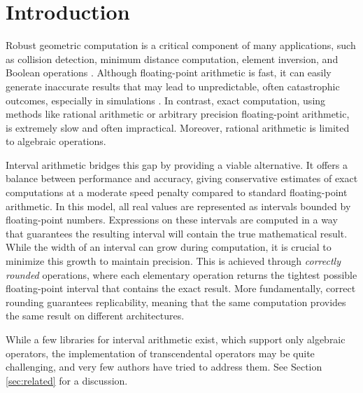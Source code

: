 
\section{Introduction}
\label{sec:introduction}
Robust geometric computation is a critical component of many applications, such as collision detection, minimum distance computation, element inversion, and Boolean operations \cite{something}. Although floating-point arithmetic is fast, it can easily generate inaccurate results that may lead to unpredictable, often catastrophic outcomes, especially in simulations \cite{something}. In contrast, exact computation, using methods like rational arithmetic or arbitrary precision floating-point arithmetic, is extremely slow and often impractical.
Moreover, rational arithmetic is limited to algebraic operations. 

Interval arithmetic bridges this gap by providing a viable alternative. 
It offers a balance between performance and accuracy, giving conservative estimates of exact computations at a moderate speed penalty compared to standard floating-point arithmetic. In this model, all real values are represented as intervals bounded by floating-point numbers. Expressions on these intervals are computed in a way that guarantees the resulting interval will contain the true mathematical result.
While the width of an interval can grow during computation, it is crucial to minimize this growth to maintain precision. This is achieved through \emph{correctly rounded} operations, where each elementary operation returns the tightest possible floating-point interval that contains the exact result.
More fundamentally, correct rounding guarantees replicability, meaning that the same computation provides the same result on different architectures. 

While a few libraries for interval arithmetic exist, which support only algebraic operators, the implementation of transcendental operators may be quite challenging, and very few authors have tried to address them. 
See Section \ref{sec:related} for a discussion. 


